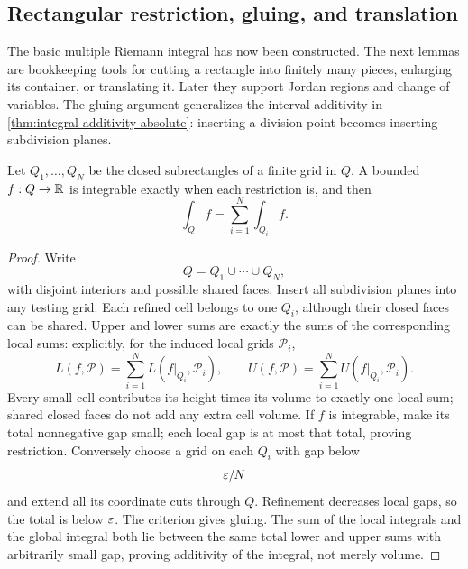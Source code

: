 \subsection{Rectangular restriction, gluing, and translation}
The basic multiple Riemann integral has now been constructed. The next
lemmas are bookkeeping tools for cutting a rectangle into finitely many
pieces, enlarging its container, or translating it. Later they support
Jordan regions and change of variables. The gluing argument generalizes
the interval additivity in \cref{thm:integral-additivity-absolute}:
inserting a division point becomes inserting subdivision planes.
\begin{lemma}\label{lem:grid-gluing}
Let $Q_1,\ldots,Q_N$ be the closed subrectangles of a finite grid in $Q$.
A bounded $f:Q\to\mathbb{R}$ is integrable exactly when each restriction is,
and then
\[
\int_Q f=\sum_{i=1}^N\int_{Q_i}f.
\]
\end{lemma}
\begin{proof}
Write
\[
Q=Q_1\cup\cdots\cup Q_N,
\]
 with disjoint interiors and possible
shared faces. Insert all subdivision planes into any testing grid. Each refined cell
belongs to one $Q_i$, although their closed faces can be shared. Upper
and lower sums are exactly the sums of the corresponding local sums:
explicitly, for the induced local grids $\mathcal P_i$,
\[
L(f,\mathcal P)=\sum_{i=1}^N L(f|_{Q_i},\mathcal P_i),\qquad
U(f,\mathcal P)=\sum_{i=1}^N U(f|_{Q_i},\mathcal P_i).
\]
Every small cell contributes its height times its volume to exactly one
local sum; shared closed faces do not add any extra cell volume.
If $f$ is integrable, make its total nonnegative gap small; each local
gap is at most that total, proving restriction. Conversely choose a grid
on each $Q_i$ with gap below
\[
\varepsilon/N
\]
 and extend all its coordinate cuts
through $Q$. Refinement decreases local gaps, so the total is below $\varepsilon$.
The criterion gives gluing. The sum of the local integrals and the global
integral both lie between the same total lower and upper sums with
arbitrarily small gap, proving additivity of the integral, not merely volume.
\end{proof}

